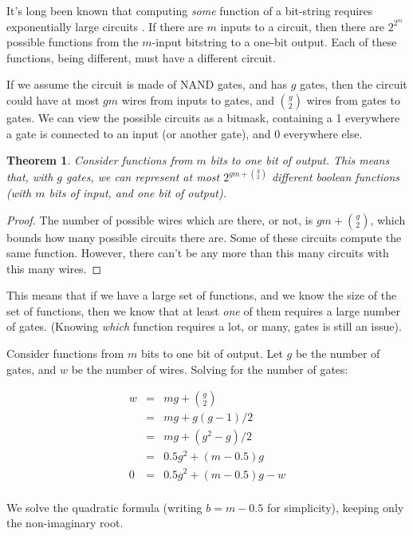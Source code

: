 \documentclass[12pt]{article}
\newtheorem{thm}{Theorem}[section]
\theoremstyle{definition}
\begin{document}
It's long been known that computing {\em some} function of a bit-string
requires exponentially large circuits \cite{shannon_synthesis_1949}.
If there are $m$ inputs to a circuit,
then there are $2^{2^m}$ possible functions from the $m$-input bitstring to
a one-bit output. Each of these functions, being different, must have a
different circuit.

If we assume the circuit is made of NAND gates, and has $g$ gates, then the
circuit could have at most $gm$ wires from inputs to gates, and ${g \choose 2}$
wires from gates to gates. We can view the possible circuits as a bitmask,
containing a 1 everywhere a gate is connected to an input (or another gate),
and 0 everywhere else.

\begin{thm}
\label{boundFromCounting}
Consider functions from $m$ bits to one bit of output.
This means that, with $g$ gates, we can represent at most
$2^{gm + {g \choose 2}}$ different boolean functions (with $m$ bits of input,
and one bit of output).
\end{thm}
\begin{proof}

The number of possible wires which are there, or not, is $gm + {g \choose 2}$,
which bounds how many possible circuits there are.
Some of these circuits compute the same function.
However, there can't be any more than this many circuits with this many wires.
\end{proof}

This means that if we have a large set of functions, and we know the size of
the set of functions, then we know that at least {\em one} of them requires
a large number of gates. (Knowing {\em which} function requires a lot, or many,
gates is still an issue).

Consider functions from $m$ bits to one bit of output.
Let $g$ be the number of gates, and $w$ be the number of wires.
Solving for the number of gates:

\begin{eqnarray*}
w & = & mg + {g \choose 2} \\
  & = & mg + g(g-1)/2 \\
  & = & mg + (g^2 - g) / 2 \\
  & = & 0.5g^2 + (m-0.5)g \\
0 & = & 0.5g^2 + (m-0.5)g - w \\
\end{eqnarray*}

We solve the quadratic formula (writing $b = m-0.5$ for simplicity), keeping
only the non-imaginary root.
\end{document}
